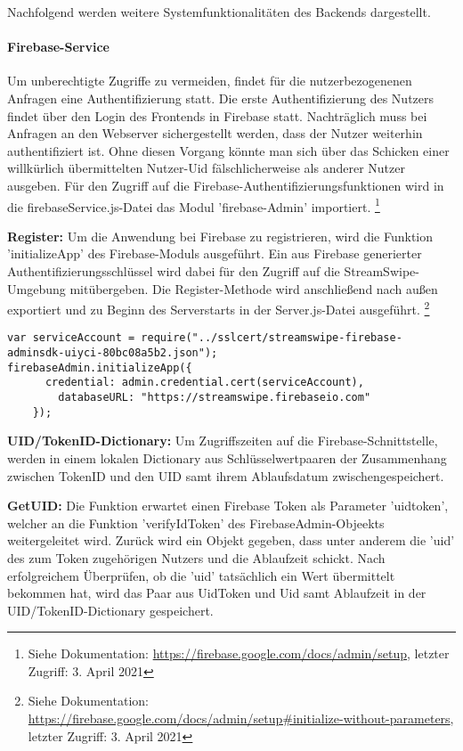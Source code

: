 Nachfolgend werden weitere Systemfunktionalitäten des Backends dargestellt.

\paragraph{Firebase-Service}
Um unberechtigte Zugriffe zu vermeiden, findet für die nutzerbezogenenen Anfragen eine Authentifizierung statt. Die erste Authentifizierung des Nutzers findet über den Login des Frontends in Firebase statt. Nachträglich muss bei Anfragen an den Webserver sichergestellt werden, dass der Nutzer weiterhin authentifiziert ist. Ohne diesen Vorgang könnte man sich über das Schicken einer willkürlich übermittelten Nutzer-Uid fälschlicherweise als anderer Nutzer ausgeben. Für den Zugriff auf die Firebase-Authentifizierungsfunktionen wird in die firebaseService.js-Datei das Modul 'firebase-Admin' importiert. \footnote{Siehe Dokumentation: \url{https://firebase.google.com/docs/admin/setup}, letzter Zugriff: 3. April 2021}

\noindent
{}
\textbf{Register:}
Um die Anwendung bei Firebase zu registrieren, wird die Funktion 'initializeApp' des Firebase-Moduls ausgeführt. 
Ein aus Firebase generierter Authentifizierungsschlüssel wird dabei für den Zugriff auf die StreamSwipe-Umgebung mitübergeben.
Die Register-Methode wird anschließend nach außen exportiert und zu Beginn des Serverstarts in der Server.js-Datei ausgeführt. 
\footnote{Siehe Dokumentation: \url{https://firebase.google.com/docs/admin/setup\#initialize-without-parameters}, letzter Zugriff: 3. April 2021}
   
\begin{lstlisting}[caption=Firebase-Service Register, label=lst:firebaseService Register]
var serviceAccount = require("../sslcert/streamswipe-firebase-adminsdk-uiyci-80bc08a5b2.json");
firebaseAdmin.initializeApp({
      credential: admin.credential.cert(serviceAccount),
        databaseURL: "https://streamswipe.firebaseio.com"
    });
\end{lstlisting}

\noindent
{}
\textbf{UID/TokenID-Dictionary:}
Um Zugriffszeiten auf die Firebase-Schnittstelle, werden in einem lokalen Dictionary aus Schlüsselwertpaaren der Zusammenhang zwischen TokenID und den UID samt ihrem Ablaufsdatum zwischen\-gespeichert.

\noindent
{}
\textbf{GetUID:}
Die Funktion erwartet einen Firebase Token als Parameter 'uidtoken', welcher an die Funktion 'verifyIdToken' des FirebaseAdmin-Objeekts weitergeleitet wird. Zurück wird ein Objekt gegeben, dass unter anderem die 'uid' des zum Token zugehörigen Nutzers und die Ablaufzeit schickt. Nach erfolgreichem Überprüfen, ob die 'uid' tatsächlich ein Wert übermittelt bekommen hat, wird das Paar aus UidToken und Uid samt Ablaufzeit in der UID/TokenID-Dictionary gespeichert.

